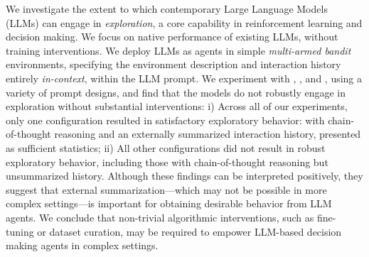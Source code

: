 We investigate the extent to which contemporary Large Language Models (LLMs) can engage in \emph{exploration}, a core capability in reinforcement learning and decision making. We focus on native performance of existing LLMs, without training interventions. We deploy LLMs as agents in simple \emph{multi-armed bandit} environments, specifying the environment description and interaction history entirely \emph{in-context}, \ie within the LLM prompt. We experiment with \gptthree, \gptfour, and \llama, using a variety of prompt designs, and find that the models do not robustly engage in exploration without substantial interventions: i) Across all of our experiments, only one configuration resulted in satisfactory exploratory behavior: \gptfour with chain-of-thought reasoning and an externally summarized interaction history, presented as sufficient statistics; ii) All other configurations did not result in robust exploratory behavior, including those with chain-of-thought reasoning but unsummarized history.
Although these findings can be interpreted positively, they suggest that external summarization---which may not be possible in more complex settings---is important for obtaining desirable behavior from LLM agents.
We conclude that non-trivial algorithmic interventions, such as fine-tuning or dataset curation, may be required to empower LLM-based decision making agents in complex settings.




